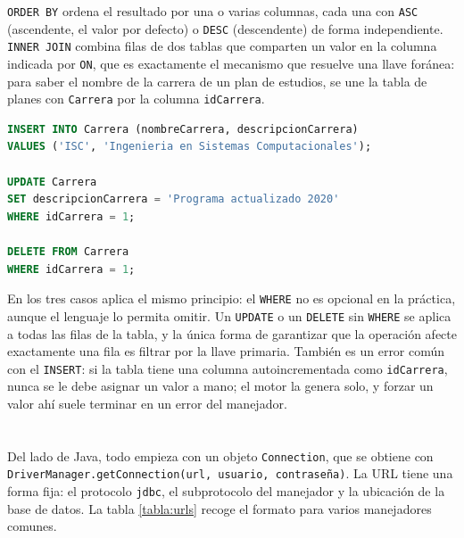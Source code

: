 \documentclass[10pt,a4paper]{article}
\begin{document}
\texttt{ORDER BY} ordena el resultado por una o varias columnas, cada una con \texttt{ASC} (ascendente, el valor por defecto) o \texttt{DESC} (descendente) de forma independiente. \texttt{INNER JOIN} combina filas de dos tablas que comparten un valor en la columna indicada por \texttt{ON}, que es exactamente el mecanismo que resuelve una llave foránea: para saber el nombre de la carrera de un plan de estudios, se une la tabla de planes con \texttt{Carrera} por la columna \texttt{idCarrera}.

\begin{lstlisting}[language=SQL, caption={Las tres sentencias que modifican datos, sobre la tabla \texttt{Carrera}}]
INSERT INTO Carrera (nombreCarrera, descripcionCarrera)
VALUES ('ISC', 'Ingenieria en Sistemas Computacionales');

UPDATE Carrera
SET descripcionCarrera = 'Programa actualizado 2020'
WHERE idCarrera = 1;

DELETE FROM Carrera
WHERE idCarrera = 1;
\end{lstlisting}

En los tres casos aplica el mismo principio: el \texttt{WHERE} no es opcional en la práctica, aunque el lenguaje lo permita omitir. Un \texttt{UPDATE} o un \texttt{DELETE} sin \texttt{WHERE} se aplica a todas las filas de la tabla, y la única forma de garantizar que la operación afecte exactamente una fila es filtrar por la llave primaria. También es un error común con el \texttt{INSERT}: si la tabla tiene una columna autoincrementada como \texttt{idCarrera}, nunca se le debe asignar un valor a mano; el motor la genera solo, y forzar un valor ahí suele terminar en un error del manejador.

\section{\color{colorIPN}{Conexión con JDBC}}

Del lado de Java, todo empieza con un objeto \texttt{Connection}, que se obtiene con \texttt{DriverManager.getConnection(url, usuario, contraseña)}. La URL tiene una forma fija: el protocolo \texttt{jdbc}, el subprotocolo del manejador y la ubicación de la base de datos. La tabla \ref{tabla:urls} recoge el formato para varios manejadores comunes.
\end{document}
